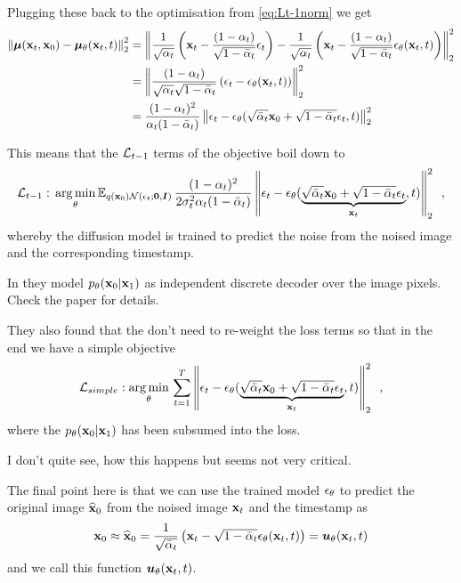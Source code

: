 Plugging these back to the optimisation from \eqref{eq:Lt-1norm} we get
\begin{align*}
    \left\lVert{\bm{\mu}}({\mathbf{x}}_t, {\mathbf{x}}_0) - {\bm{\mu}}_{\theta}({\mathbf{x}}_t, t)\right\rVert_2^2 &=
    \left\lVert\frac{1}{\sqrt{\alpha_t}} \left( {\mathbf{x}}_t - \frac{(1-\alpha_t)}{\sqrt{1 - \bar{\alpha}_t}} {\mathbf{\epsilon}}_t  \right) 
    - \frac{1}{\sqrt{\alpha_t}} \left( {\mathbf{x}}_t - \frac{(1-\alpha_t)}{\sqrt{1 - \bar{\alpha}_t}} {\mathbf{\epsilon}}_{\theta}({\mathbf{x}}_t, t)  \right)
    \right\rVert_2^2 \nonumber \\
    &= \left\lVert
    \frac{(1-\alpha_t)}{\sqrt{\alpha_t}\sqrt{1 - \bar{\alpha}_t}} \left( {\mathbf{\epsilon}}_t - {\mathbf{\epsilon}}_{\theta}({\mathbf{x}}_t, t) \right)
    \right\rVert_2^2 \nonumber \\
    &= \frac{(1-\alpha_t)^2}{\alpha_t(1 - \bar{\alpha}_t)}
    \left\lVert{\mathbf{\epsilon}}_t - {\mathbf{\epsilon}}_{\theta}( \sqrt{\bar{\alpha}_t} {\mathbf{x}}_0 + \sqrt{1 - \bar{\alpha}_t} {\mathbf{\epsilon}}_t, t) \right\rVert_2^2
\end{align*}

This means that the $\mathcal{L}_{t-1}$ terms of the objective boil down to 
\begin{equation*}
    \mathcal{L}_{t-1}: \, \operatorname*{arg\,min}_{\theta} \mathbb{E}_{q({\mathbf{x}}_0)\mathcal{N}({\mathbf{\epsilon}}_t; \mathbf{0}, {\bm{I}})} \,
    \frac{(1-\alpha_t)^2}{2\sigma_t^2 \alpha_t(1 - \bar{\alpha}_t)} \left\lVert{\mathbf{\epsilon}}_t - {\mathbf{\epsilon}}_{\theta}( \underbrace{\sqrt{\bar{\alpha}_t} {\mathbf{x}}_0 + \sqrt{1 - \bar{\alpha}_t} {\mathbf{\epsilon}}_t}_{{\mathbf{x}}_t}, t) \right\rVert_2^2 \enspace ,
\end{equation*}
whereby the diffusion model is trained to predict the noise from the noised image and the corresponding timestamp.

In \cite{ho_denoising_2020} they model $p_{\theta}({\mathbf{x}}_0 | {\mathbf{x}}_1)$ as independent discrete decoder over the image pixels. Check the paper for details.

They also found that the don't need to re-weight the loss terms so that in the end we have a simple objective
\begin{equation*}
    \mathcal{L}_{simple}: \operatorname*{arg\,min}_{\theta} \, \sum_{t=1}^T \left\lVert{\mathbf{\epsilon}}_t - {\mathbf{\epsilon}}_{\theta}( \underbrace{\sqrt{\bar{\alpha}_t} {\mathbf{x}}_0 + \sqrt{1 - \bar{\alpha}_t} {\mathbf{\epsilon}}_t}_{{\mathbf{x}}_t}, t) \right\rVert_2^2 \enspace ,
\end{equation*}
where the $p_{\theta}({\mathbf{x}}_0 | {\mathbf{x}}_1)$ has been subsumed into the loss.
\begin{notebox}[colback=red!5]
    I don't quite see, how this happens but seems not very critical.
\end{notebox}

The final point here is that we can use the trained model ${\mathbf{\epsilon}}_{\theta}$ to predict the original image $\widehat{{\mathbf{x}}}_0$ from the noised image ${\mathbf{x}}_t$ and the timestamp as
\begin{equation}
    {\mathbf{x}}_0 \approx \widehat{{\mathbf{x}}}_0 = \frac{1}{\sqrt{\bar{\alpha}_t}} \left( {\mathbf{x}}_t - \sqrt{1 - \bar{\alpha}_t} {\mathbf{\epsilon}}_{\theta} ({\mathbf{x}}_t, t) \right) = {\bm{u}}_{\theta}({\mathbf{x}}_t, t)
\end{equation}
and we call this function ${\bm{u}}_{\theta}({\mathbf{x}}_t, t)$.


